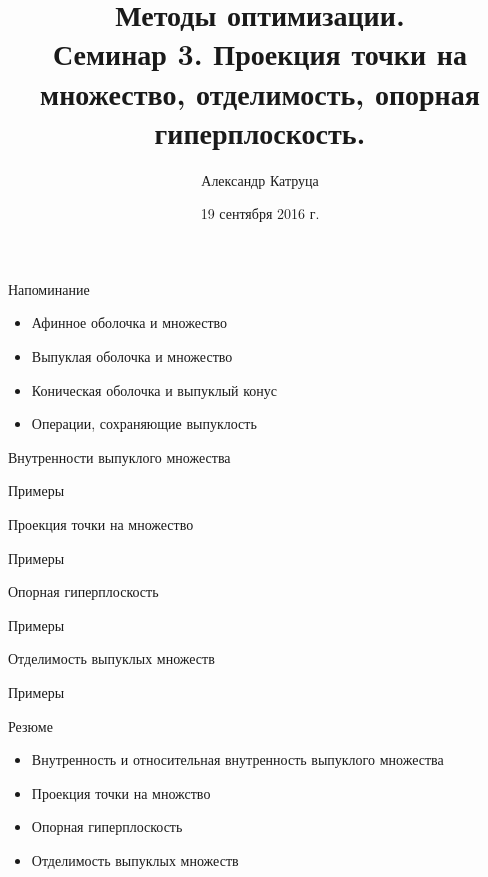 \documentclass[12pt,russian]{beamer}
\title[Семинар 3]{Методы оптимизации. \\
 Семинар 3. Проекция точки на множество, отделимость, опорная гиперплоскость.}
\author{Александр Катруца}
\institute{Московский физико-технический институт,\\
Факультет Управления и Прикладной Математики}
\date{19 сентября 2016 г.}
\begin{document}
\begin{frame}
\maketitle
\end{frame}

\begin{frame}{Напоминание}
\begin{itemize}
\item Афинное оболочка и множество
\item Выпуклая оболочка и множество
\item Коническая оболочка и выпуклый конус
\item Операции, сохраняющие выпуклость
\end{itemize}
\end{frame}

\begin{frame}{Внутренности выпуклого множества}

\end{frame}

\begin{frame}{Примеры}

\end{frame}

\begin{frame}{Проекция точки на множество}

\end{frame}

\begin{frame}{Примеры}

\end{frame}

\begin{frame}{Опорная гиперплоскость}

\end{frame}

\begin{frame}{Примеры}

\end{frame}

\begin{frame}{Отделимость выпуклых множеств}

\end{frame}

\begin{frame}{Примеры}

\end{frame}

\begin{frame}{Резюме}
\begin{itemize}
\item Внутренность и относительная внутренность выпуклого множества
\item Проекция точки на множство
\item Опорная гиперплоскость
\item Отделимость выпуклых множеств
\end{itemize}
\end{frame}
\end{document}

